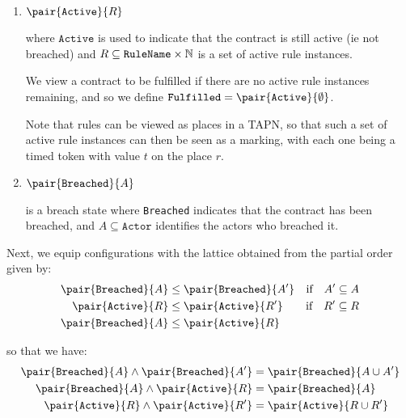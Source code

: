 \documentclass{article}
\begin{document}
\begin{enumerate}
  \item
  $\pair{\texttt{Active}}{R}$
  
  where $\texttt{Active}$ is used to indicate that the contract is still active
  (ie not breached) and
  $R \subseteq \texttt{RuleName} \times \operatorname{\mathbb{N}}$
  is a set of active rule instances.

  We view a contract to be fulfilled if there are no active rule instances
  remaining, and so we define
  $\texttt{Fulfilled} = \pair{\texttt{Active}}{\emptyset}$.

  Note that rules can be viewed as places in a TAPN, so that such a set of
  active rule instances can then be seen as a marking, with each one being a
  timed token with value $t$ on the place $r$.




  \item
  $\pair{\texttt{Breached}}{A}$

  is a breach state where \texttt{Breached} indicates that the contract has
  been breached, and $A \subseteq \texttt{Actor}$ identifies the actors who
  breached it.
\end{enumerate}

Next, we equip configurations with the lattice obtained from the partial order
given by:
\begin{align*}
    \pair{\texttt{Breached}}{A} & \leq
    \pair{\texttt{Breached}}{A'}
    & \text{if} \quad A' \subseteq A
    \\
    \pair{\texttt{Active}}{R} & \leq
    \pair{\texttt{Active}}{R'}
    & \text{if} \quad R' \subseteq R
    \\ 
    \pair{\texttt{Breached}}{A} & \leq
    \pair{\texttt{Active}}{R}
\end{align*}

so that we have:
\begin{align*}
  \pair{\texttt{Breached}}{A}
  \wedge
  \pair{\texttt{Breached}}{A'}
  & = \pair{\texttt{Breached}}{{A \cup A'}}
  \\
  \pair{\texttt{Breached}}{A}
  \wedge
  \pair{\texttt{Active}}{R}
  & = \pair{\texttt{Breached}}{A}
  \\
  \pair{\texttt{Active}}{R}
  \wedge
  \pair{\texttt{Active}}{R'}
  & = \pair{\texttt{Active}}{R \cup R'}
\end{align*}
\end{document}
